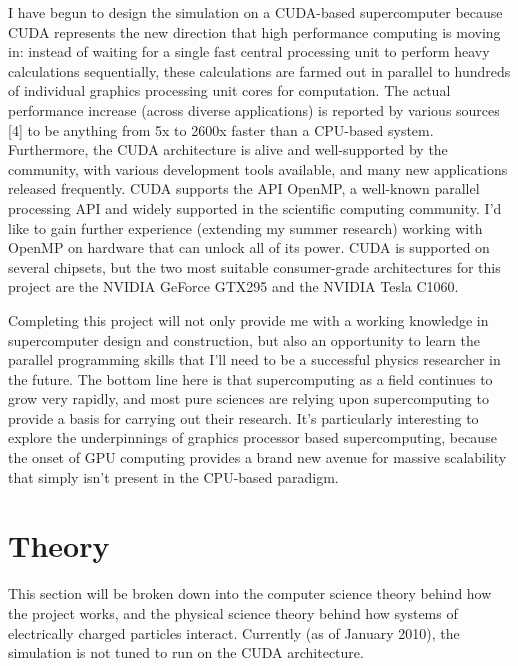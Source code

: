 \documentclass[10pt]{article}
\begin{document}
I have begun to design the simulation on a CUDA-based supercomputer because CUDA represents the new direction that high performance computing is moving in: instead of waiting for a single fast central processing unit to perform heavy calculations sequentially, these calculations are farmed out in parallel to hundreds of individual graphics processing unit cores for computation. The actual performance increase (across diverse applications) is reported by various sources [4] to be anything from 5x to 2600x faster than a CPU-based system. Furthermore, the CUDA architecture is alive and well-supported by the community, with various development tools available, and many new applications released frequently. CUDA supports the API OpenMP, a well-known parallel processing API and widely supported in the scientific computing community. I'd like to gain further experience (extending my summer research) working with OpenMP on hardware that can unlock all of its power. CUDA is supported on several chipsets, but the two most suitable consumer-grade architectures for this project are the NVIDIA GeForce GTX295 and the NVIDIA Tesla C1060. 

Completing this project will not only provide me with a working knowledge in supercomputer design and construction, but also an opportunity to learn the parallel programming skills that I'll need to be a successful physics researcher in the future. The bottom line here is that supercomputing as a field continues to grow very rapidly, and most pure sciences are relying upon supercomputing to provide a basis for carrying out their research. It's particularly interesting to explore the underpinnings of graphics processor based supercomputing, because the onset of GPU computing provides a brand new avenue for massive scalability that simply isn't present in the CPU-based paradigm.

\section{Theory}
This section will be broken down into the computer science theory behind how the project works, and the physical science theory behind how systems of electrically charged particles interact. Currently (as of January 2010), the simulation is not tuned to run on the CUDA architecture.
\end{document}
